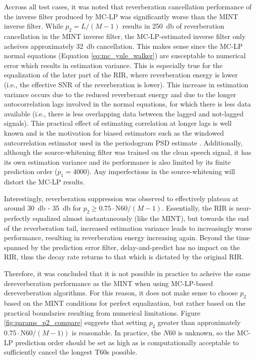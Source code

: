 Accross all test cases, it was noted that reverberation cancellation performance of the inverse filter produced by MC-LP was significantly worse than the MINT inverse filter. While $p_2=L/\left(M-1\right)$ results in \qty{250}{\decibel} of reverberation cancellation in the MINT inverse filter, the MC-LP-estimated inverse filter only acheives approximately \qty{32}{\decibel} cancellation. This makes sense since the MC-LP normal equations (Equation \ref{eq:mc_yule_walker}) are susceptable to numerical error which results in estimation variance. This is especially true for the equalization of the later part of the RIR, where reverberation energy is lower (i.e., the effective SNR of the reverberation is lower). This increase in estimation variance occurs due to the reduced reverberant energy and due to the longer autocorrelation lags involved in the normal equations, for which there is less data available (i.e., there is less overlapping data between the lagged and not-lagged signals). This practical effect of estimating correlation at longer lags is well known and is the motivation for biased estimators such as the windowed autcorrelation estimator used in the periodogram PSD estimate \citep{oppenheim1999discrete}. Additionally, although the source-whitening filter was trained on the clean speech signal, it has its own estimation variance and its performance is also limited by its finite prediction order ($p_1 = 4000$). Any imperfections in the source-whitening will distort the MC-LP results.

Interestingly, reverberation suppression was observed to effectively plateau at around \qty{30}{\decibel} - \qty{35}{\decibel} for $p_2 \ge 0.75 \cdot \mathrm{N60} / \left(M-1\right)$. Essentially, the RIR is near-perfectly equalized almost instantaneously (like the MINT), but towards the end of the reverberation tail, increased estimation variance leads to increasingly worse performance, resulting in reverberation energy increasing again. Beyond the time spanned by the prediction error filter, delay-and-predict has no impact on the RIR, thus the decay rate returns to that which is dictated by the original RIR.

Therefore, it was concluded that it is not possible in practice to acheive the same dereverberation performance as the MINT when using MC-LP-based dereverberation algorithms. For this reason, it does not make sense to choose $p_2$ based on the MINT conditions for perfect equalization, but rather based on the practical boundaries resulting from numerical limitations. Figure \ref{fig:params_p2_compare} suggests that setting $p_2$ greater than approximately $0.75 \cdot \mathrm{N60} / \left(M-1)\right)$ is reasonable. In practice, the $N60$ is unknown, so the MC-LP prediction order should be set as high as is computationally acceptable to sufficiently cancel the longest T60s possible.

